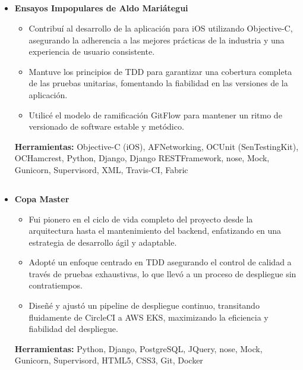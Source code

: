 \documentclass[11pt,a4paper,english]{moderncv}
\begin{document}
\subsection{}

{
\begin{itemize}
    \item \textbf{Ensayos Impopulares de Aldo Mariátegui}
        \begin{itemize}
            \item Contribuí al desarrollo de la aplicación para iOS utilizando Objective-C, asegurando la adherencia a las mejores prácticas de la industria y una experiencia de usuario consistente.
            \item Mantuve los principios de TDD para garantizar una cobertura completa de las pruebas unitarias, fomentando la fiabilidad en las versiones de la aplicación.
            \item Utilicé el modelo de ramificación GitFlow para mantener un ritmo de versionado de software estable y metódico.
        \end{itemize}
        \textbf{Herramientas:} Objective-C (iOS), AFNetworking, OCUnit (SenTestingKit), OCHamcrest, Python, Django, Django RESTFramework, nose, Mock, Gunicorn, Supervisord, XML, Travis-CI, Fabric
\end{itemize}
}

\subsection{}

{
    \begin{itemize}
        \item \textbf{Copa Master}
            \begin{itemize}
                \item Fui pionero en el ciclo de vida completo del proyecto desde la arquitectura hasta el mantenimiento del backend, enfatizando en una estrategia de desarrollo ágil y adaptable.
                \item Adopté un enfoque centrado en TDD asegurando el control de calidad a través de pruebas exhaustivas, lo que llevó a un proceso de despliegue sin contratiempos.
                \item Diseñé y ajustó un pipeline de despliegue continuo, transitando fluidamente de CircleCI a AWS EKS, maximizando la eficiencia y fiabilidad del despliegue.
            \end{itemize}
            \textbf{Herramientas:} Python, Django, PostgreSQL, JQuery, nose, Mock, Gunicorn, Supervisord, HTML5, CSS3, Git, Docker
    \end{itemize}
}
\end{document}
